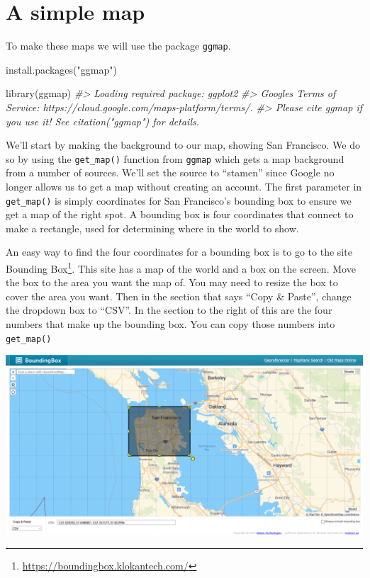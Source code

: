 \documentclass[
]{krantz}
\makeatletter
\newenvironment{Shaded}{\begin{snugshade}}{\end{snugshade}}
\newcommand{\CommentTok}[1]{\textcolor[rgb]{0.37,0.37,0.37}{\textit{#1}}}
\newcommand{\FunctionTok}[1]{\textcolor[rgb]{0,0,0}{#1}}
\newcommand{\NormalTok}[1]{#1}
\newcommand{\StringTok}[1]{\textcolor[rgb]{0.5,0.5,0.5}{#1}}
\renewcommand{\href}[2]{#2\footnote{\url{#1}}}
\newenvironment{kframe}{%
\medskip{}
\setlength{\fboxsep}{.8em}
 \def\at@end@of@kframe{}%
 \ifinner\ifhmode%
  \def\at@end@of@kframe{\end{minipage}}%
  \begin{minipage}{\columnwidth}%
 \fi\fi%
 \def\FrameCommand##1{\hskip\@totalleftmargin \hskip-\fboxsep
 \colorbox{shadecolor}{##1}\hskip-\fboxsep
     \hskip-\linewidth \hskip-\@totalleftmargin \hskip\columnwidth}%
 \MakeFramed {\advance\hsize-\width
   \@totalleftmargin\z@ \linewidth\hsize
   \@setminipage}}%
 {\par\unskip\endMakeFramed%
 \at@end@of@kframe}
\renewenvironment{Shaded}{\begin{kframe}}{\end{kframe}}
\makeatother
\begin{document}
\hypertarget{a-simple-map}{%
\section{A simple map}\label{a-simple-map}}

To make these maps we will use the package \texttt{ggmap}.

\begin{Shaded}
\begin{Highlighting}[]
\FunctionTok{install.packages}\NormalTok{(}\StringTok{"ggmap"}\NormalTok{)}
\end{Highlighting}
\end{Shaded}

\begin{Shaded}
\begin{Highlighting}[]
\FunctionTok{library}\NormalTok{(ggmap)}
\CommentTok{\#\textgreater{} Loading required package: ggplot2}
\CommentTok{\#\textgreater{} Google\textquotesingle{}s Terms of Service: https://cloud.google.com/maps{-}platform/terms/.}
\CommentTok{\#\textgreater{} Please cite ggmap if you use it! See citation("ggmap") for details.}
\end{Highlighting}
\end{Shaded}

We'll start by making the background to our map, showing San Francisco. We do so by using the \texttt{get\_map()} function from \texttt{ggmap} which gets a map background from a number of sources. We'll set the source to ``stamen'' since Google no longer allows us to get a map without creating an account. The first parameter in \texttt{get\_map()} is simply coordinates for San Francisco's bounding box to ensure we get a map of the right spot. A bounding box is four coordinates that connect to make a rectangle, used for determining where in the world to show.

An easy way to find the four coordinates for a bounding box is to go to the site \href{https://boundingbox.klokantech.com/}{Bounding Box}. This site has a map of the world and a box on the screen. Move the box to the area you want the map of. You may need to resize the box to cover the area you want. Then in the section that says ``Copy \& Paste'', change the dropdown box to ``CSV''. In the section to the right of this are the four numbers that make up the bounding box. You can copy those numbers into \texttt{get\_map()}

\includegraphics{images/bounding_box.PNG}
\end{document}
